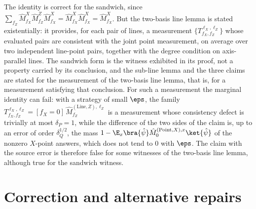 \documentclass[11pt]{article}
\begin{document}
The identity is correct for the sandwich, since
$\sum_{f_Z} \hat{M}^{X}_{f_X} \hat{M}^{Z}_{f_Z} \hat{M}^{X}_{f_X}
= \hat{M}^{X}_{f_X} \hat{M}^{X}_{f_X} = \hat{M}^{X}_{f_X}$.  But the
two-basis line lemma is stated existentially: it provides, for each pair
of lines, a measurement $\{T^{\ell_X,\ell_Z}_{f_X,f_Z}\}$ whose evaluated
pairs are consistent with the joint point measurement, on average over two
independent line-point pairs, together with the degree condition on
axis-parallel lines.  The sandwich form is the witness exhibited in its
proof, not a property carried by its conclusion, and the sub-line lemma and
the three claims are stated for the measurement of the two-basis line
lemma, that is, for a measurement satisfying that conclusion.  For such a
measurement the marginal identity can fail: with a strategy of small
$\eps$, the family
$T^{\ell_X,\ell_Z}_{f_X,f_Z} = [f_X = 0]\,
\hat{M}^{(\mathrm{Line},Z),\ell_Z}_{f_Z}$ is a measurement whose
consistency defect is trivially at most $\delta_P = 1$, while the
difference of the two sides of the claim is, up to an error of order
$\delta_Q^{1/2}$, the mass $1 - \E_x \bra{\hat\psi}
\hat{M}^{(\mathrm{Point},X),x}_{0} \ket{\hat\psi}$ of the nonzero
$X$-point answers, which does not tend to $0$ with $\eps$.  The claim with
the source error is therefore false for some witnesses of the two-basis
line lemma, although true for the sandwich witness.

\section{Correction and alternative repairs}
\end{document}
